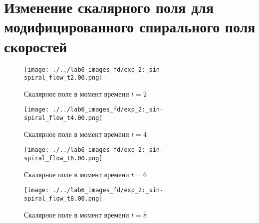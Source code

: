 \chapter{Изменение скалярного поля  для модифицированного спирального поля скоростей}
\label{app:shear_df}

\begin{figure}[h]
	\centering
	\texttt{[image: ./../lab6\_images\_fd/exp\_2:\_sin-spiral\_flow\_t2.00.png]}
	\caption{Скалярное поле в момент времени $t=2$ }
\end{figure}
\begin{figure}[h]
	\centering
	\texttt{[image: ./../lab6\_images\_fd/exp\_2:\_sin-spiral\_flow\_t4.00.png]}
	\caption{Скалярное поле в момент времени $t=4$}
\end{figure}
\begin{figure}[h]
	\centering
	\texttt{[image: ./../lab6\_images\_fd/exp\_2:\_sin-spiral\_flow\_t6.00.png]}
	\caption{Скалярное поле в момент времени $t=6$ }
\end{figure}
\begin{figure}[h]
	\centering
	\texttt{[image: ./../lab6\_images\_fd/exp\_2:\_sin-spiral\_flow\_t8.00.png]}
	\caption{Скалярное поле в момент времени $t=8$ }
\end{figure}